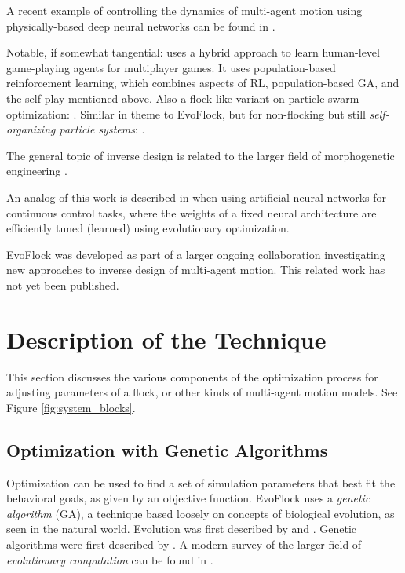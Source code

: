 \documentclass[letterpaper]{article}
\begin{document}
A recent example of controlling the dynamics of multi-agent motion using physically-based deep neural networks can be found in \citet{kim_commanding_2025}.

Notable, if somewhat tangential: \citet{jaderberg_human-level_2019} uses a hybrid approach to learn human-level game-playing agents for multiplayer games. It uses population-based reinforcement learning, which combines aspects of RL, population-based GA, and the self-play mentioned above. Also a flock-like variant on particle swarm optimization: \citet{hereford_flockopt_2011}. Similar in theme to EvoFlock, but for non-flocking but still \textit{self-organizing particle systems}: \citet{parkar_evolving_2024}.

The general topic of inverse design is related to the larger field of morphogenetic engineering \citep{doursat_morphogenetic_2012}. 

An analog of this work is described in \citet{el_saliby_eventually_2024} when using artificial neural networks for continuous control tasks, where the weights of a fixed neural architecture are efficiently tuned (learned) using evolutionary optimization.

EvoFlock was developed as part of a larger ongoing collaboration investigating new approaches to inverse design of multi-agent motion. This related work has not yet been published.

\section{Description of the Technique}
\label{sec:Description}

This section discusses the various components of the optimization process for adjusting parameters of a flock, or other kinds of multi-agent motion models. See Figure \ref{fig:system_blocks}.

\subsection{Optimization with Genetic Algorithms}
\label{subsec:Optimization_with_GA}

Optimization can be used to find a set of simulation parameters that best fit the behavioral goals, as given by an objective function. EvoFlock uses a \textit{genetic algorithm} (GA), a technique based loosely on concepts of biological evolution, as seen in the natural world. Evolution was first described by \citet{darwin_origin_1859} and \citet{wallace_tendency_1858}. Genetic algorithms were first described by \citet{holland_adaptation_1975}. A modern survey of the larger field of \textit{evolutionary computation} can be found in
\citet{de_jong_evolutionary_2016}.
\end{document}
